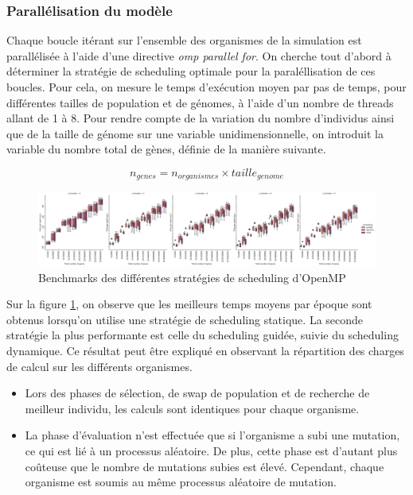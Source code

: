 \documentclass[a4paper, 10pt, twoside]{article}
\begin{document}
\subsubsection{Parallélisation du modèle}

Chaque boucle itérant sur l'ensemble des organismes de la simulation est parallélisée à l'aide d'une directive \textit{omp parallel for}. On cherche tout d'abord à déterminer la stratégie de scheduling optimale pour la paraléllisation de ces boucles. Pour cela, on mesure le temps d'exécution moyen par pas de temps, pour différentes tailles de population et de génomes, à l'aide d'un nombre de threads allant de 1 à 8. Pour rendre compte de la variation du nombre d'individus ainsi que de la taille de génome sur une variable unidimensionnelle, on introduit la variable du nombre total de gènes, définie de la manière suivante.

$$ n_{genes} = n_{organismes} \times taille_{genome} $$

\begin{figure}[htb]
	\centering
	\includegraphics[width=\linewidth]{img/scheduling_strategies_n_genes_by_n_threads.pdf}
	\caption{Benchmarks des différentes stratégies de scheduling d'OpenMP}
	\label{fig:benchmarks/scheduling}
\end{figure}

Sur la figure \ref{fig:benchmarks/scheduling}, on observe que les meilleurs temps moyens par époque sont obtenus lorsqu'on utilise une stratégie de scheduling statique. La seconde stratégie la plus performante est celle du scheduling guidée, suivie du scheduling dynamique. Ce résultat peut être expliqué en observant la répartition des charges de calcul sur les différents organismes.

\begin{itemize}
	\item Lors des phases de sélection, de swap de population et de recherche de meilleur individu, les calculs sont identiques pour chaque organisme.
	\item La phase d'évaluation n'est effectuée que si l'organisme a subi une mutation, ce qui est lié à un processus aléatoire. De plus, cette phase est d'autant plus coûteuse que le nombre de mutations subies est élevé. Cependant, chaque organisme est soumis au même processus aléatoire de mutation.
\end{itemize}
\end{document}
